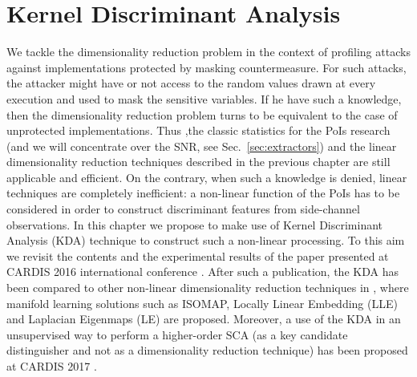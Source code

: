 
\chapter{Kernel Discriminant Analysis} %
\label{ChapterKernel}

We tackle the dimensionality reduction problem in the context of profiling attacks against implementations protected by masking countermeasure. For such attacks, the attacker might have or not access to the  random values drawn at every execution and used to mask the sensitive variables. If he have such a knowledge, then the dimensionality reduction problem turns to be equivalent to the case of unprotected implementations. Thus ,the classic statistics for the PoIs research (and we will concentrate over the SNR, see Sec.~\ref{sec:extractors}) and the linear dimensionality reduction techniques described in the previous chapter are still applicable and efficient. On the contrary, when such a knowledge is denied, linear techniques are completely inefficient: a non-linear function of the PoIs has to be considered in order to construct discriminant features from side-channel observations. In this chapter we propose to make use of Kernel Discriminant Analysis (KDA) technique to construct such a non-linear processing. To this aim we revisit the contents and the experimental results of the paper presented at CARDIS 2016 international conference \cite{cagli2016kernel}. After such a publication, the KDA has been compared to other non-linear dimensionality reduction techniques in \cite{manifold}, where manifold learning solutions such as ISOMAP, Locally Linear Embedding (LLE) and Laplacian Eigenmaps (LE) are proposed. Moreover, a use of the KDA in an unsupervised way to perform a higher-order SCA (as a key candidate distinguisher and not as a dimensionality reduction technique) has been proposed at CARDIS 2017 \cite{zhou2017novel}.



